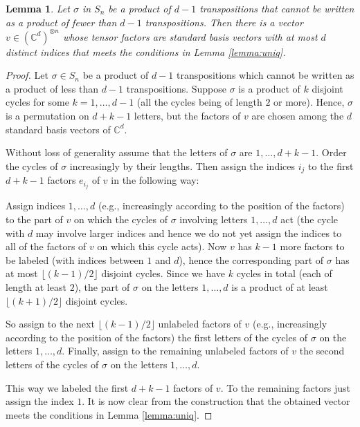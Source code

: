 \documentclass[12pt,dvipsnames,accepted=2016-08-18,a4paper,onecolumn]{quantumarticle}
\numberwithin{equation}{section}
\newcommand{\CC}{\mathbb C}
\newtheorem{lemma}[theorem]{Lemma}
\theoremstyle{definition}
\begin{document}
	
\begin{lemma}\label{lemma:v}
	Let $\sigma$ in $S_n$ be a product of $d-1$ transpositions that cannot be written as a product of fewer than $d-1$ transpositions. Then there is a vector $v \in (\mathbb{C}^d)^{\otimes n}$ whose tensor factors are standard basis vectors with at most $d$ distinct indices that meets the conditions in Lemma \ref{lemma:uniq}.
\end{lemma}	



\begin{proof}
	Let $\sigma \in S_n$ be a product of $d-1$ transpositions which cannot be written as a product of less than $d-1$ transpositions. Suppose $\sigma$ is a product of $k$ disjoint cycles for some $k=1,\ldots,d-1$ (all the cycles being of length $2$ or more). Hence, $\sigma$ is a permutation on $d+k-1$ letters, but the factors of $v$ are chosen among the $d$ standard basis vectors of $\CC^d.$ 
	
Without loss of generality assume that the letters of $\sigma$ are $1,\ldots,d+k-1.$	
Order the cycles of $\sigma$ increasingly by their lengths.
Then assign the indices $i_j$  to the first $d+k-1$ factors $e_{i_j}$ of $v$ in the following way: 

Assign indices $1,\ldots,d$ (e.g., increasingly according to the position of the factors) to the part of $v$ on which the cycles of $\sigma$ involving letters $1,\ldots,d$ act (the cycle with $d$ may involve larger indices and hence we do not yet assign the indices to all of the factors of $v$ on which this cycle acts). Now $v$ has $k-1$ more factors to be labeled (with indices between $1$ and $d$), hence the corresponding part of $\sigma$ has at most $\lfloor (k-1)/2 \rfloor$ disjoint cycles. Since we have $k$ cycles in total (each of length at least $2$), the part of $\sigma$ on the letters $1,\ldots,d$ is a product of at least $\lfloor (k+1)/2 \rfloor$ disjoint cycles. 

So assign to the next $\lfloor (k-1)/2 \rfloor$ unlabeled factors of $v$  (e.g., increasingly according to the position of the factors) the first letters of the cycles of $\sigma$ on the letters $1,\ldots,d.$ Finally, assign to the remaining unlabeled factors of $v$ the second letters of the cycles of $\sigma$ on the letters $1,\ldots,d.$

This way we labeled the first $d+k-1$ factors of $v.$ To the remaining factors just assign the index $1.$
It is now clear from the construction that the obtained vector meets the conditions in Lemma \ref{lemma:uniq}. 
\end{proof}
\end{document}
